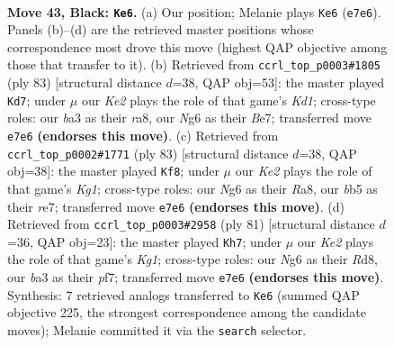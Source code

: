 \documentclass[11pt]{article}
\begin{document}
\clearpage

\begin{figure}[p]\centering
\begin{subfigure}{0.46\textwidth}\centering
\resizebox{\linewidth}{!}{%
\newchessgame
\chessboard[
  setfen={3r4/p3k3/Pp4nb/1B3p2/4pP2/B7/5K2/1R6 b - - 19 43},
  showmover=false,
  pgfstyle=straightmove, color=movearrow, markmove={e7-e6}
]}
\caption{}
\end{subfigure}\hfill
\begin{subfigure}{0.46\textwidth}\centering
\resizebox{\linewidth}{!}{%
\newchessgame
\chessboard[
  setfen={R2k4/4bp1p/6p1/4B3/4PPK1/8/5r1P/8 b - - 4 42},
  showmover=false,
  pgfstyle=straightmove, color=movearrow, markmove={d8-d7}
]}
\caption{}
\end{subfigure}
\\[4pt]
\begin{subfigure}{0.46\textwidth}\centering
\resizebox{\linewidth}{!}{%
\newchessgame
\chessboard[
  setfen={r5k1/1b2R2p/2npB1p1/6P1/1p2p3/4B3/1P6/6K1 b - - 0 42},
  showmover=false,
  pgfstyle=straightmove, color=movearrow, markmove={g8-f8}
]}
\caption{}
\end{subfigure}\hfill
\begin{subfigure}{0.46\textwidth}\centering
\resizebox{\linewidth}{!}{%
\newchessgame
\chessboard[
  setfen={3r2k1/1p3Pp1/7p/5b2/p7/B5PP/B7/6K1 b - - 0 41},
  showmover=false,
  pgfstyle=straightmove, color=movearrow, markmove={g8-h7}
]}
\caption{}
\end{subfigure}
\caption{\textbf{Move 43, Black: \texttt{Ke6}.} (a) Our position; Melanie plays \texttt{Ke6} (\texttt{e7e6}). Panels (b)--(d) are the retrieved master positions whose correspondence most drove this move (highest QAP objective among those that transfer to it). (b) Retrieved from \texttt{ccrl\_top\_p0003\#1805} (ply 83) [structural distance $d$=38, QAP obj=53]: the master played \texttt{Kd7}; under $\mu$ our \emph{Ke2} plays the role of that game's \emph{Kd1}; cross-type roles: our \emph{b}a3 as their \emph{r}a8, our \emph{N}g6 as their \emph{B}e7; transferred move \texttt{e7e6} \textbf{(endorses this move)}. (c) Retrieved from \texttt{ccrl\_top\_p0002\#1771} (ply 83) [structural distance $d$=38, QAP obj=38]: the master played \texttt{Kf8}; under $\mu$ our \emph{Ke2} plays the role of that game's \emph{Kg1}; cross-type roles: our \emph{N}g6 as their \emph{R}a8, our \emph{b}b5 as their \emph{r}e7; transferred move \texttt{e7e6} \textbf{(endorses this move)}. (d) Retrieved from \texttt{ccrl\_top\_p0003\#2958} (ply 81) [structural distance $d$=36, QAP obj=23]: the master played \texttt{Kh7}; under $\mu$ our \emph{Ke2} plays the role of that game's \emph{Kg1}; cross-type roles: our \emph{N}g6 as their \emph{R}d8, our \emph{b}a3 as their \emph{p}f7; transferred move \texttt{e7e6} \textbf{(endorses this move)}. Synthesis: 7 retrieved analogs transferred to \texttt{Ke6} (summed QAP objective 225, the strongest correspondence among the candidate moves); Melanie committed it via the \texttt{search} selector.}
\label{fig:thought-m85}
\end{figure}
\end{document}

